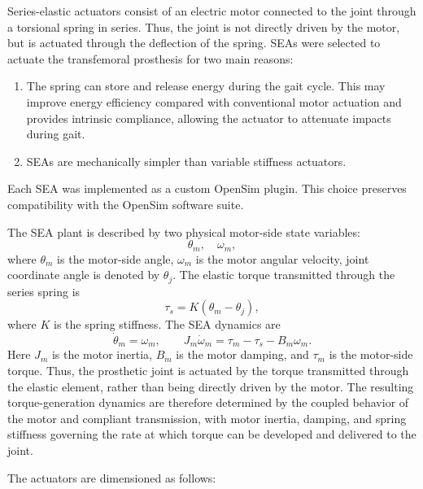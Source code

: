 \noindent
Series-elastic actuators consist of an electric motor connected to the joint through a torsional spring in series. Thus, the joint is not directly driven by the motor, but is actuated through the deflection of the spring. SEAs were selected to actuate the transfemoral prosthesis for two main reasons:
\begin{enumerate}
  \item The spring can store and release energy during the gait cycle. This may improve energy efficiency compared with conventional motor actuation and provides intrinsic compliance, allowing the actuator to attenuate impacts during gait.
  \item SEAs are mechanically simpler than variable stiffness actuators.
\end{enumerate}
\noindent
Each SEA was implemented as a custom OpenSim plugin. This choice preserves compatibility with the OpenSim software suite.

The SEA plant is described by two physical motor-side state variables:
\begin{equation}
  \theta_m,\quad \omega_m ,
\end{equation}
where \(\theta_m\) is the motor-side angle, \(\omega_m\) is the motor angular
velocity, joint coordinate angle is denoted by \(\theta_j\). The
elastic torque transmitted through the series spring is
\begin{equation}
  \tau_s = K(\theta_m - \theta_j),
  \label{eq:sea-spring}
\end{equation}
where \(K\) is the spring stiffness. 
\newline The SEA dynamics are
\begin{equation}
\dot{\theta}_m = \omega_m,\qquad
J_m\dot{\omega}_m = \tau_m - \tau_s - B_m\omega_m .
\label{eq:sea-dynamics}
\end{equation}
Here \(J_m\) is the motor inertia, \(B_m\) is the motor damping, and
\(\tau_m\) is the motor-side torque.
\newline 
Thus, the prosthetic joint is actuated by the torque transmitted through the
elastic element, rather than being directly driven by the motor. The resulting
torque-generation dynamics are therefore determined by the coupled behavior of
the motor and compliant transmission, with motor inertia, damping, and spring
stiffness governing the rate at which torque can be developed and delivered to
the joint.

\noindent The actuators are dimensioned as follows:

